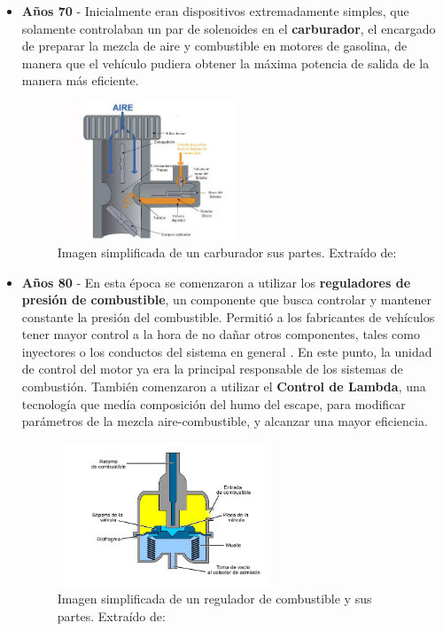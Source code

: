 \begin{itemize}

    \item \textbf{Años 70} - Inicialmente eran dispositivos extremadamente simples, que solamente controlaban un par de solenoides en el \textbf{carburador}, el encargado de preparar la mezcla de aire y combustible en motores de gasolina, de manera que el vehículo pudiera obtener la máxima potencia de salida de la manera más eficiente.

    \begin{figure}[h]
        \centering
        \includegraphics[width=0.5\textwidth]{imagenes/esquema_carburador.png}
        \caption{Imagen simplificada de un carburador sus partes. Extraído de: \cite{carburador}}
    \end{figure}
 
    \item \textbf{Años 80} - En esta época se comenzaron a utilizar los \textbf{reguladores de presión de combustible}, un componente que busca controlar y mantener constante la presión del combustible. Permitió a los fabricantes de vehículos tener mayor control a la hora de no dañar otros componentes, tales como inyectores o los conductos del sistema en general \cite{regulador}. En este punto, la unidad de control del motor ya era la principal responsable de los sistemas de combustión. También comenzaron a utilizar el \textbf{Control de Lambda}, una tecnología que medía composición del humo del escape, para modificar parámetros de la mezcla aire-combustible, y alcanzar una mayor eficiencia.

    \begin{figure}[h]
        \centering
        \includegraphics[width=0.6\textwidth]{imagenes/esquema_rpc.png}
        \caption{Imagen simplificada de un regulador de combustible y sus partes. Extraído de: \cite{regulador_img}}
    \end{figure}



\end{itemize}
